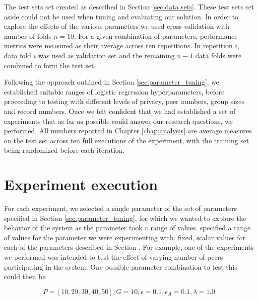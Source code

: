 The test sets set created as described in Section \ref{sec:data sets}. These test sets set aside could not be used when tuning and evaluating our solution. In order to explore the effects of the various parameters we used cross-validation with number of folds $n=10$. For a given combination of parameters, performance metrics were measured as their average across ten repetitions. In repetition $i$, data fold $i$ was used as validation set and the remaining $n-1$ data folds were combined to form the test set.

Following the approach outlined in Section \ref{sec:parameter_tuning}, we established suitable ranges of logistic regression hyperparameters, before proceeding to testing with different levels of privacy, peer numbers, group sizes and record numbers. Once we felt confident that we had established a set of experiments that as far as possible could answer our research questions, we performed. All numbers reported in Chapter \ref{chap:analysis} are average measures on the test set across ten full executions of the experiment, with the training set being randomized before each iteration.




\section{Experiment execution}

For each experiment, we selected a single parameter of the set of parameters specified in Section \ref{sec:parameter_tuning}, for which we wanted to explore the behavior of the system as the parameter took a range of values. specified a range of values for the parameter we were experimenting with. fixed, scalar values for each of the parameters described in Section . For example, one of the experiments we performed was intended to test the effect of varying number of peers participating in the system. One possible parameter combination to test this could then be

$$P=[10, 20, 30, 40, 50], G=10, \epsilon=0.1, \epsilon_{A}=0.1, \lambda=1.0$$

